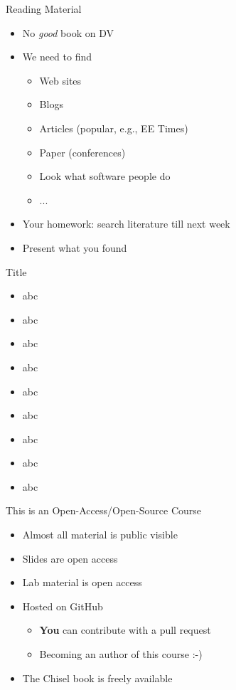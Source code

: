 \begin{frame}[fragile]{Reading Material}
\begin{itemize}
\item No \emph{good} book on DV
\item We need to find
\begin{itemize}
\item Web sites
\item Blogs
\item Articles (popular, e.g., EE Times)
\item Paper (conferences)
\item Look what software people do
\item ...
\end{itemize}
\item Your homework: search literature till next week
\item Present what you found
\end{itemize}
\end{frame}

\begin{frame}[fragile]{Title}
\begin{itemize}
\item abc
\item abc
\item abc
\item abc
\item abc
\item abc
\item abc
\item abc
\item abc
\end{itemize}
\end{frame}



\begin{frame}[fragile]{This is an Open-Access/Open-Source Course}
\begin{itemize}
\item Almost all material is public visible
\item Slides are open access
\item Lab material is open access
\item Hosted on GitHub
\begin{itemize}
\item \textbf{You} can contribute with a pull request
\item Becoming an author of this course :-)
\end{itemize}
\item The Chisel book is freely available
\end{itemize}
\end{frame}




